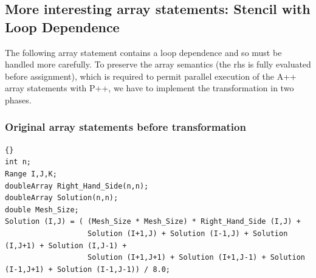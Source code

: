 \documentclass[10pt]{article}
\begin{document}
\subsection{ More interesting array statements: Stencil with Loop Dependence }

     The following array statement contains a loop dependence and so must be handled more carefully.
To preserve the array semantics (the rhs is fully evaluated before assignment), which is required to
permit parallel execution of the A++ array statements with P++, we have to implement the
transformation in two phases.
    
\subsubsection{Original array statements before transformation}

\begin{lstlisting}{}
int n;
Range I,J,K;
doubleArray Right_Hand_Side(n,n);
doubleArray Solution(n,n);
double Mesh_Size;
Solution (I,J) = ( (Mesh_Size * Mesh_Size) * Right_Hand_Side (I,J) +
                   Solution (I+1,J) + Solution (I-1,J) + Solution (I,J+1) + Solution (I,J-1) +
                   Solution (I+1,J+1) + Solution (I+1,J-1) + Solution (I-1,J+1) + Solution (I-1,J-1)) / 8.0;
\end{lstlisting}
\end{document}
